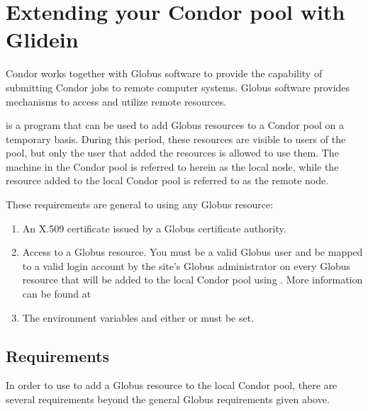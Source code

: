 \section{Extending your Condor pool with Glidein}\label{sec:Glidein}

Condor works together with Globus software to provide the capability
of submitting Condor jobs to remote computer systems.
Globus software provides mechanisms to access and utilize
remote resources.

 is a program that can be used to add Globus resources
to a Condor pool on a temporary basis.
During this period, these resources are visible 
to users of the pool, but only the user
that added the resources is allowed to use them.
The machine in the Condor pool is referred to herein as the
local node, while the resource added to the local Condor pool
is referred to as the remote node.

These requirements are general to using any Globus resource:
\begin{enumerate}

\item An X.509 certificate issued by a Globus certificate authority.

\item Access to a Globus resource.
You must be a valid Globus user and be mapped to a valid login account by
the site's Globus administrator on every Globus resource that will be
added to the local Condor pool using .
More information can be found at 

\item The environment variables  and either
 or 
must be set.

\end{enumerate}


\subsection{ Requirements}
In order to use  to add a Globus resource to the
local Condor pool,
there are several requirements beyond the general Globus requirements
given above.

